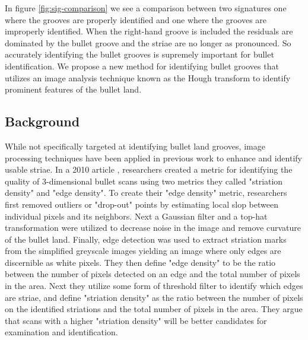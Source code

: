 \documentclass[12pt]{article}\usepackage[]{graphicx}\usepackage[]{color}
\theoremstyle{nonumberplain}
\begin{document}

In figure \ref{fig:sig-comparison} we see a comparison between two signatures one where the grooves are properly identified and one where the grooves are improperly identified. When the right-hand groove is included the residuals are dominated by the bullet groove and the striae are no longer as pronounced. So accurately identifying the bullet grooves is supremely important for bullet identification. We propose a new method for identifying bullet grooves that utilizes an image analysis technique known as the Hough transform to identify prominent features of the bullet land. 

\subsection{Background}

While not specifically targeted at identifying bullet land grooves, image processing techniques have been applied in previous work to enhance and identify usable striae. In a 2010 article \cite{chu2010}, researchers created a metric for identifying the quality of 3-dimensional bullet scans using two metrics they called "striation density" and "edge density". To create their "edge density" metric, researchers first removed outliers or "drop-out" points by estimating local slop between individual pixels and its neighbors. Next a Gaussian filter and a top-hat transformation were utilized to decrease noise in the image and remove curvature of the bullet land. Finally, edge detection was used to extract striation marks from the simplified greyscale images yielding an image where only edges are discernible as white pixels. They then define "edge density" to be the ratio between the number of pixels detected on an edge and the total number of pixels in the area. Next they utilize some form of threshold filter to identify which edges are striae, and define "striation density" as the ratio between the number of pixels on the identified striations and the total number of pixels in the area. They argue that scans with a higher "striation density" will be better candidates for examination and identification. 
\end{document}

